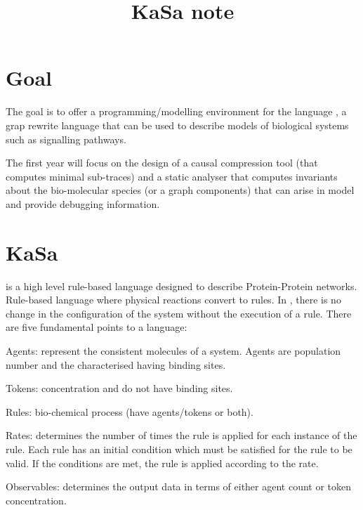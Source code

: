 \documentclass{article}
\begin{document}
\title{KaSa note}
\maketitle



\newcommand\kasa{\tool{KaSa}}
\newcommand\kapa{\tool{Kappa}}

\section{Goal}

The goal is to offer a programming/modelling environment for the language
\kapa, a grap rewrite language that can be used to describe models of
biological systems such as signalling pathways.

The first year will focus on the design of a causal compression tool (that
computes minimal sub-traces) and a static analyser that computes invariants
about the bio-molecular species (or a graph components) that can arise in
model and provide debugging information.

\section{KaSa}

\kasa is a high level rule-based language designed to describe
Protein-Protein networks.  Rule-based language where physical reactions
convert to rules.  In \kapa, there is no change in the configuration of the
system without the execution of a rule. There are five fundamental points
to a \kapa language:

\begin{e}
\item Agents: represent the consistent molecules of a system. Agents are
  population number and the characterised having binding sites.
\item Tokens: concentration and do not have binding sites.
\item Rules: bio-chemical process (have agents/tokens or both).
\item Rates: determines the number of times the rule is applied for each
  instance of the rule. Each rule has an initial condition which must be
  satisfied for the rule to be valid. If the conditions are met, the rule
  is applied according to the rate.
\item Observables: determines the output data in terms of either agent
  count or token concentration.
\end{e}
\end{document}
